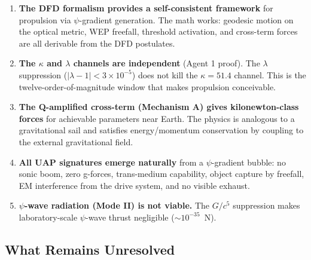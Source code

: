 \documentclass[12pt,aps,prd,superscriptaddress,nofootinbib,longbibliography]{revtex4-2}
\begin{document}
\begin{enumerate}
\item \textbf{The DFD formalism provides a self-consistent framework}
for propulsion via $\psi$-gradient generation.  The math works: geodesic
motion on the optical metric, WEP freefall, threshold activation, and
cross-term forces are all derivable from the DFD postulates.

\item \textbf{The $\kappa$ and $\lambda$ channels are independent}
(Agent 1 proof).  The $\lambda$ suppression ($|\lambda-1| < 3 \times 10^{-5}$)
does not kill the $\kappa = 51.4$ channel.  This is the twelve-order-of-magnitude
window that makes propulsion conceivable.

\item \textbf{The Q-amplified cross-term (Mechanism A) gives kilonewton-class
forces} for achievable parameters near Earth.  The physics is analogous to
a gravitational sail and satisfies energy/momentum conservation by coupling
to the external gravitational field.

\item \textbf{All UAP signatures emerge naturally} from a $\psi$-gradient
bubble: no sonic boom, zero g-forces, trans-medium capability, object
capture by freefall, EM interference from the drive system, and no visible
exhaust.

\item \textbf{$\psi$-wave radiation (Mode II) is not viable.}  The
$G/c^5$ suppression makes laboratory-scale $\psi$-wave thrust negligible
($\sim 10^{-35}$~N).
\end{enumerate}

\subsection{What Remains Unresolved}
\end{document}
